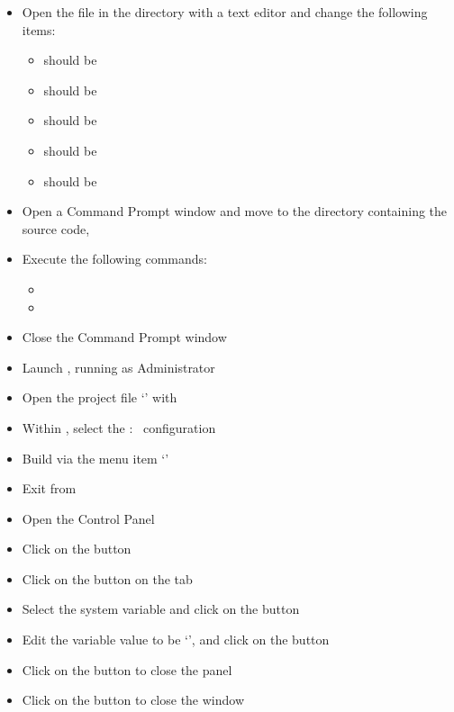 \begin{itemize}
\item Open the file  in the
 directory with a text editor and change the
following items:
\begin{itemize}
\item {} should be 
\item\exSp{} should be 
\item\exSp{} should be 
\item\exSp{} should be 
\item\exSp{} should be 
\end{itemize}
\item\exSp{}Open a Command Prompt window and move to the directory containing the
\mplusm{} source code, 
\item\exSp{}Execute the following commands:
\begin{itemize}
\item {}
\item\exSp{}
\end{itemize}
\item\exSp{}Close the Command Prompt window
\item\exSp{}Launch , running as Administrator
\item\exSp{}Open the project file
`' with
\item\exSp{}Within , select the  :\ 
configuration
\item\exSp{}Build via the menu item `'
\item\exSp{}Exit from 
\item\exSp{}Open the  Control Panel
\item\exSp{}Click on the  button
\item\exSp{}Click on the  button on the 
tab
\item\exSp{}Select the  system variable and click on the 
button 
\item\exSp{}Edit the variable value to be `',
and click on the  button
\item\exSp{}Click on the  button to close the 
panel
\item\exSp{}Click on the  button to close the 
window
\end{itemize}
